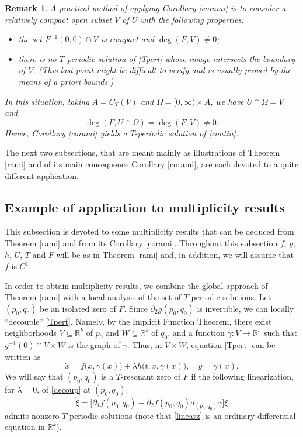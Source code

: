 \documentclass[a4paper]{amsart}
\numberwithin{equation}{section}
\newtheorem{remark}[theorem]{Remark}
\newcommand{\R}{\mathbb{R}}
\begin{document}
\begin{remark}
A practical method of applying Corollary \eqref{corami} is to consider a relatively
compact open subset $V$ of $U$ with the following properties:
\begin{itemize}
  \item the set $F^{-1}(0,0)\cap V$ is compact and  $\deg(F,V)\neq 0$;
  \item there is no $T$-periodic solution of \eqref{Tpert} whose image intersects 
        the boundary of $V$. (This last point might be difficult to verify and is usually 
            proved by the means of a priori bounds.)
\end{itemize}
In this situation, taking $A= C_T(V)$ and $\Omega=[0,\infty)\times A$, we have
$U\cap\Omega=V$ and
\[
 \deg(F,U\cap\Omega)=\deg(F,V)\neq 0.
\]
Hence, Corollary \ref{corami} yields a $T$-periodic solution of \eqref{contin}.
\end{remark}

The next two subsections, that are meant mainly as illustrations of Theorem \ref{rami} 
and of its main consequence Corollary \ref{corami}, are each devoted to a quite different 
application.

\subsection{Example of application to multiplicity results}
This subsection is devoted to some multiplicity results that can be deduced from 
Theorem \ref{rami} and from its Corollary \ref{corami}. Throughout this subsection $f$, 
$g$, $h$, $U$, $T$ and $F$ will be as in Theorem \ref{rami} and, in addition, we 
will assume that $f$ is $C^1$.

In order to obtain multiplicity results, we combine the global approach of
Theorem \ref{rami} with a local analysis of the set of $T$-periodic solutions. 
Let $(p_0,q_0)$ be an isolated zero of $F$. Since $\partial_2g(p_0,q_0)$ is invertible, 
we can locally ``decouple'' \eqref{Tpert}. Namely, by the Implicit Function Theorem, 
there exist neighborhoods $V\subseteq\R^k$ of $p_0$ and $W\subseteq\R^s$ of $q_0$, and 
a function $\gamma:V\to\R^s$ such that $g^{-1}(0)\cap V\times W$ is the graph of $\gamma$. 
Thus, in $V\times W$, equation \eqref{Tpert} can be written as
\begin{subequations}\label{bidec}
\begin{equation}\label{decoup} 
\dot x= f\big(x,\gamma(x)\big)+\lambda h\big(t,x,\gamma(x)\big),
\end{equation}
\begin{equation}
\quad y=\gamma(x).
\end{equation}
\end{subequations}
We will say that $(p_0,q_0)$ is a $T$-resonant zero of $F$ if the following linearization, for 
$\lambda=0$, of \eqref{decoup} at $(p_0,q_0)$:
\begin{equation}\label{linearz}
\dot\xi=\big[\partial_1 f(p_0,q_0)
             -\partial_2f(p_0,q_0)d_{(p_0,q_0)}\gamma\big]\xi 
\end{equation}
admits nonzero $T$-periodic solutions (note that \eqref{linearz} is an ordinary differential 
equation in $\R^k$).
\end{document}
